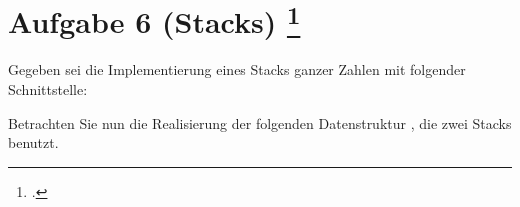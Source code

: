 \documentclass{bschlangaul-aufgabe}
\begin{document}
\let\j=\bJavaCode
{}
\section{Aufgabe 6 (Stacks)
\footcite{examen:46115:2019:09}}

Gegeben sei die Implementierung eines Stacks ganzer Zahlen mit folgender
Schnittstelle:


\noindent
Betrachten Sie nun die Realisierung der folgenden Datenstruktur
\j{Mystery}, die zwei Stacks benutzt.

\end{document}
